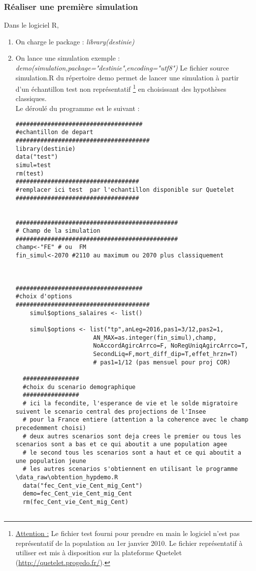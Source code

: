 \subsubsection{Réaliser une première simulation}
Dans le logiciel R,
\begin{enumerate}
\item On charge le package : \textit{library(destinie)}
\item On lance une simulation exemple : \textit{demo(simulation,package="destinie",encoding="utf8")} Le fichier source simulation.R du répertoire demo permet de lancer une simulation à partir d'un échantillon test non représentatif \footnote{\underline{Attention :} Le fichier test fourni pour prendre en main le logiciel n'est pas représentatif de la population au 1er janvier 2010. Le fichier représentatif à utiliser est mis à disposition sur la plateforme Quetelet (\url{http://quetelet.progedo.fr/}).} en choisissant des hypothèses classiques.\\
Le déroulé du programme est le suivant :
\begin{lstlisting}
####################################
#echantillon de depart
######################################
library(destinie)
data("test")
simul=test
rm(test)
###################################
#remplacer ici test  par l'echantillon disponible sur Quetelet 
###################################


##############################################
# Champ de la simulation 
##############################################
champ<-"FE" # ou  FM
fin_simul<-2070 #2110 au maximum ou 2070 plus classiquement



####################################
#choix d'options
######################################
    simul$options_salaires <- list()    
    
    simul$options <- list("tp",anLeg=2016,pas1=3/12,pas2=1,
                      AN_MAX=as.integer(fin_simul),champ,
                      NoAccordAgircArrco=F, NoRegUniqAgircArrco=T, 
                      SecondLiq=F,mort_diff_dip=T,effet_hrzn=T) 
                      # pas1=1/12 (pas mensuel pour proj COR)

  ################
  #choix du scenario demographique 
  ################
  # ici la fecondite, l'esperance de vie et le solde migratoire suivent le scenario central des projections de l'Insee
  # pour la France entiere (attention a la coherence avec le champ precedemment choisi)
  # deux autres scenarios sont deja crees le premier ou tous les scenarios sont a bas et ce qui aboutit a une population agee
  # le second tous les scenarios sont a haut et ce qui aboutit a une population jeune    
  # les autres scenarios s'obtiennent en utilisant le programme \data_raw\obtention_hypdemo.R    
  data("fec_Cent_vie_Cent_mig_Cent")
  demo=fec_Cent_vie_Cent_mig_Cent
  rm(fec_Cent_vie_Cent_mig_Cent)


\end{lstlisting}
\end{enumerate}

